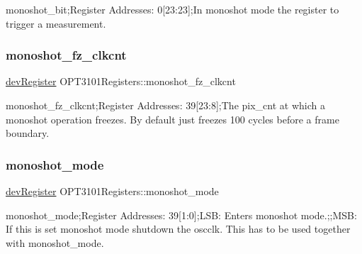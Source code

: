 monoshot\+\_\+bit;Register Addresses\+: 0\mbox{[}23\+:23\mbox{]};In monoshot mode the register to trigger a measurement. 

\mbox{\label{class_o_p_t3101_registers_ad6804e480f827776a0f1ab3372b4b395}} 
\subsubsection{\texorpdfstring{monoshot\+\_\+fz\+\_\+clkcnt}{monoshot\_fz\_clkcnt}}
{\footnotesize\ttfamily \mbox{\hyperlink{classdev_register}{dev\+Register}} O\+P\+T3101\+Registers\+::monoshot\+\_\+fz\+\_\+clkcnt}



monoshot\+\_\+fz\+\_\+clkcnt;Register Addresses\+: 39\mbox{[}23\+:8\mbox{]};The pix\+\_\+cnt at which a monoshot operation freezes. By default just freezes 100 cycles before a frame boundary. 

\mbox{\label{class_o_p_t3101_registers_a937fc19a767b3538e707dc40c4f55776}} 
\subsubsection{\texorpdfstring{monoshot\+\_\+mode}{monoshot\_mode}}
{\footnotesize\ttfamily \mbox{\hyperlink{classdev_register}{dev\+Register}} O\+P\+T3101\+Registers\+::monoshot\+\_\+mode}



monoshot\+\_\+mode;Register Addresses\+: 39\mbox{[}1\+:0\mbox{]};L\+SB\+: Enters monoshot mode.;;M\+SB\+: If this is set monoshot mode shutdown the oscclk. This has to be used together with monoshot\+\_\+mode. 

\mbox{\label{class_o_p_t3101_registers_a5ee5ee7f63e585124a2f359f0de5f87c}} 
